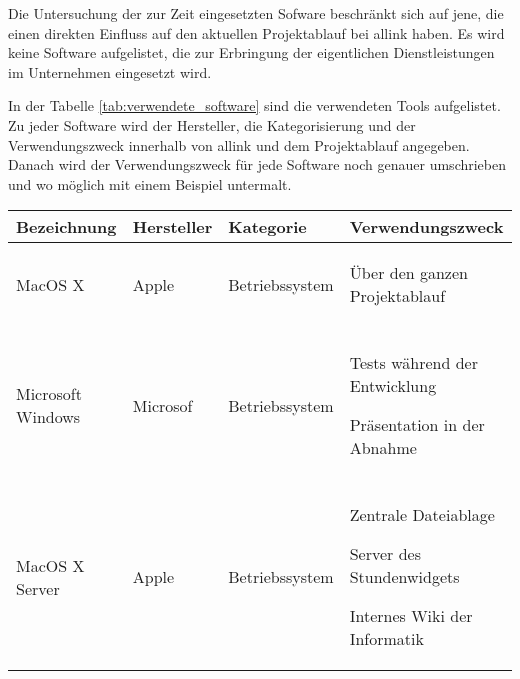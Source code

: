 Die Untersuchung der zur Zeit eingesetzten Sofware beschränkt sich auf jene,
die einen direkten Einfluss auf den aktuellen Projektablauf bei allink haben.
Es wird keine Software aufgelistet, die zur Erbringung der eigentlichen 
Dienstleistungen im Unternehmen eingesetzt wird.

In der Tabelle \ref{tab:verwendete_software} sind die verwendeten Tools
aufgelistet. Zu jeder Software wird der Hersteller, die Kategorisierung und der 
Verwendungszweck innerhalb von allink und dem Projektablauf angegeben. Danach
wird der Verwendungszweck für jede Software noch genauer umschrieben und wo
möglich mit einem Beispiel untermalt.

\begin{center}
    \begin{longtable}{lllp{6cm}}
        \toprule \textbf{Bezeichnung} & \textbf{Hersteller} & \textbf{Kategorie} & \textbf{Verwendungszweck} \\
        \midrule MacOS X & Apple & Betriebssystem & 
            \begin{minipage}[t]{6cm}
                \begin{compactitem}
                    \item Über den ganzen Projektablauf
                \end{compactitem}
            \end{minipage}
            \\\\
        \midrule Microsoft Windows & Microsof & Betriebssystem & 
            \begin{minipage}[t]{6cm}
                \begin{compactitem}
                    \item Tests während der Entwicklung
                    \item Präsentation in der Abnahme
                \end{compactitem}
            \end{minipage}
            \\\\
        \midrule MacOS X Server & Apple & Betriebssystem &
            \begin{minipage}[t]{6cm}
                \begin{compactitem}
                    \item Zentrale Dateiablage
                    \item Server des Stundenwidgets
                    \item Internes Wiki der Informatik

\end{compactitem}
\end{minipage}
\end{longtable}
\end{center}

